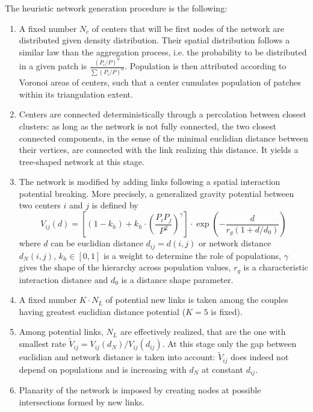 \documentclass{bmcart}
\begin{document}
The heuristic network generation procedure is the following:
\begin{enumerate}
\item A fixed number $N_c$ of centers that will be first nodes of the network are distributed given density distribution. Their spatial distribution follows a similar law than the aggregation process, i.e. the probability to be distributed in a given patch is $\frac{(P_i/P)^{\alpha}}{\sum (P_i/P)^{\alpha}}$. Population is then attributed according to Voronoi areas of centers, such that a center cumulates population of patches within its triangulation extent.
\item Centers are connected deterministically through a percolation between closest clusters: as long as the network is not fully connected, the two closest connected components, in the sense of the minimal euclidian distance between their vertices, are connected with the link realizing this distance. It yields a tree-shaped network at this stage.
\item The network is modified by adding links following a spatial interaction potential breaking. More precisely, a generalized gravity potential between two centers $i$ and $j$ is defined by
\begin{equation}
V_{ij}(d) = \left[ (1 - k_h) + k_h \cdot \left( \frac{P_i P_j}{P^2} \right)^{\gamma} \right]\cdot \exp{\left( -\frac{d}{r_g (1 + d/d_0)} \right)}
\end{equation}
where $d$ can be euclidian distance $d_{ij}=d(i,j)$ or network distance $d_N(i,j)$, $k_h \in [0,1]$ is a weight to determine the role of populations, $\gamma$ gives the shape of the hierarchy across population values, $r_g$ is a characteristic interaction distance and $d_0$ is a distance shape parameter.
\item A fixed number $K\cdot N_L$ of potential new links is taken among the couples having greatest euclidian distance potential ($K=5$ is fixed).
\item Among potential links, $N_L$ are effectively realized, that are the one with smallest rate $\tilde{V}_{ij} = V_{ij}(d_N)/V_{ij}(d_{ij})$. At this stage only the gap between euclidian and network distance is taken into account: $\tilde{V}_{ij}$ does indeed not depend on populations and is increasing with $d_N$ at constant $d_{ij}$.
\item Planarity of the network is imposed by creating nodes at possible intersections formed by new links.
\end{enumerate}
\end{document}
